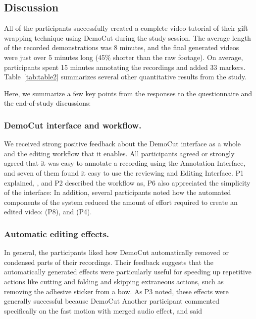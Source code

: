 
\subsection{Discussion}
All of the participants successfully created a complete video tutorial
of their gift wrapping technique using DemoCut during the study
session. The average length of the recorded demonstrations was 8
minutes, and the final generated videos were just over 5 minutes long
(45\% shorter than the raw footage). On average, participants spent 15
minutes annotating the recordings and added 33
markers. Table~\ref{tab:table2} summarizes several other quantitative
results from the study.

Here, we summarize a few key points from the responses to the
questionnaire and the end-of-study discussions:

\subsubsection{DemoCut interface and workflow.}
We received strong positive
feedback about the DemoCut interface as a whole and the editing
workflow that it enables. All participants agreed or strongly agreed that
it was easy to annotate a recording using the Annotation Interface, and seven
of them found it easy to use the reviewing and Editing Interface.
%
P1 explained, ,
and P2 described the workflow as, 
%
P6 also appreciated the simplicity of the interface: 
%
In addition, several participants noted how the automated components
of the system reduced the amount of effort required to create an
edited video:  (P8), and  (P4).

\subsubsection{Automatic editing effects.} In general, the participants
liked how DemoCut automatically removed or condensed parts of their
recordings. Their feedback suggests that the automatically generated
effects were particularly useful for speeding up repetitive actions
like cutting and folding and skipping extraneous actions, such as removing
the adhesive sticker from a bow. As P3 noted, these effects were generally successful because
DemoCut  Another participant commented specifically
on the fast motion with merged audio effect, and said  %

